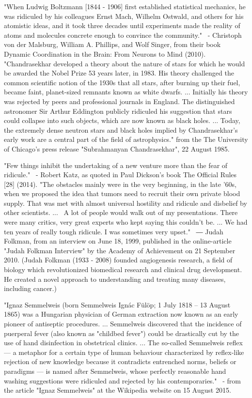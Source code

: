 \documentclass[12pt]{article}
\begin{document}
"When Ludwig Boltzmann [1844 - 1906] first established statistical mechanics, he was ridiculed by his colleagues Ernst Mach, Wilhelm Ostwald, and others for his atomistic ideas, and it took three decades until experiments made the reality of atoms and molecules concrete enough to convince the community."  - Christoph von der Malsburg, William A. Phillips, and Wolf Singer, from their book Dynamic Coordination in the Brain: From Neurons to Mind (2010).
"Chandrasekhar developed a theory about the nature of stars for which he would be awarded the Nobel Prize 53 years later, in 1983. His theory challenged the common scientific notion of the 1930s that all stars, after burning up their fuel, became faint, planet-sized remnants known as white dwarfs. ... Initially his theory was rejected by peers and professional journals in England. The distinguished astronomer Sir Arthur Eddington publicly ridiculed his suggestion that stars could collapse into such objects, which are now known as black holes. ... Today, the extremely dense neutron stars and black holes implied by Chandrasekhar’s early work are a central part of the field of astrophysics."
 from the The University of Chicago's press release "Subrahmanyan Chandrasekhar", 22 August 1985.

"Few things inhibit the undertaking of a new venture more than the fear of ridicule."  - Robert Katz, as quoted in Paul Dickson's book The Official Rules [28] (2014).
"The obstacles mainly were in the very beginning, in the late '60s, when we proposed the idea that tumors need to recruit their own private blood supply. That was met with almost universal hostility and ridicule and disbelief by other scientists. ...  A lot of people would walk out of my presentations. There were many critics, very great experts who kept saying this couldn't be. ... We had ten years of really tough ridicule. I was sometimes very upset."
 ― Judah Folkman, from an interview on June 18, 1999, published in the online-article "Judah Folkman Interview" by the Academy of Achievement on 21 September 2010. (Judah Folkman (1933 - 2008) founded angiogenesis research, a field of biology which revolutionized biomedical research and clinical drug development. He created a novel approach to understanding and treating many diseases, including cancer.)

"Ignaz Semmelweis (born Semmelweis Ignác Fülöp; 1 July 1818 – 13 August 1865) was a Hungarian physician of German extraction now known as an early pioneer of antiseptic procedures. ... Semmelweis discovered that the incidence of puerperal fever (also known as "childbed fever") could be drastically cut by the use of hand disinfection in obstetrical clinics. ... The so-called Semmelweis reflex — a metaphor for a certain type of human behaviour characterized by reflex-like rejection of new knowledge because it contradicts entrenched norms, beliefs or paradigms — is named after Semmelweis, whose perfectly reasonable hand washing suggestions were ridiculed and rejected by his contemporaries."
 - from the article "Ignaz Semmelweis" at the Wikipedia website on 15 August 2015.
\end{document}
